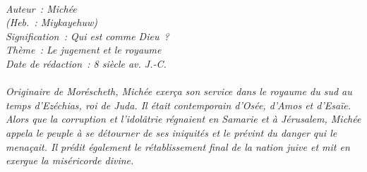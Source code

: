 \BFont
\noindent\hrulefill
{\footnotesize
\textit{
\bigskip
{\centering{}
\\Auteur~: Michée
\\(Heb.~: Miykayehuw)
\\Signification~: Qui est comme Dieu~?
\\Thème~: Le jugement et le royaume
\\Date de rédaction~: 8 siècle av. J.-C.\\}
}
\textit{
\\Originaire de Moréscheth, Michée exerça son service dans le royaume du sud au temps d'Ezéchias, roi de Juda. Il était contemporain d'Osée, d'Amos et d'Esaïe. Alors que la corruption et l'idolâtrie régnaient en Samarie et à Jérusalem, Michée appela le peuple à se détourner de ses iniquités et le prévint du danger qui le menaçait. Il prédit également le rétablissement final de la nation juive et mit en exergue la miséricorde divine.\bigskip
}
}
\par\nobreak\noindent\hrulefill
